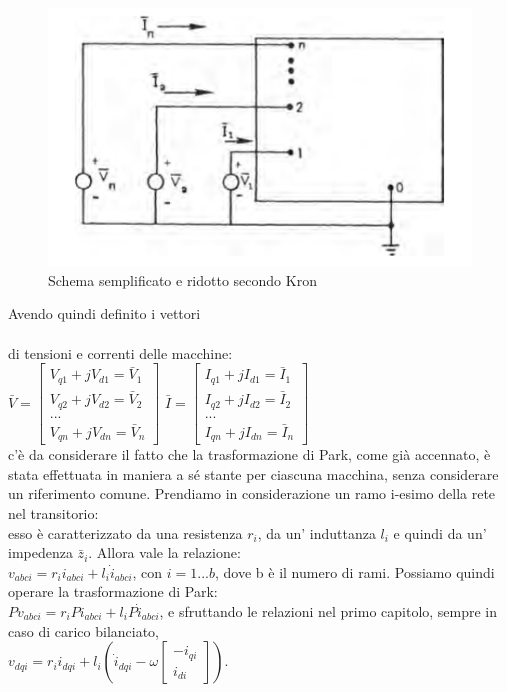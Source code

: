 \documentclass[Lau,noexaminfo]{sapthesis}
\begin{document}
	\begin{figure}
		\centering
		\includegraphics[height=0.25\textheight]{ridotta}
		\caption{Schema semplificato e ridotto secondo Kron}
	\end{figure}
	Avendo quindi definito i vettori\\\\ di tensioni e correnti delle macchine:\\
	$\bar{V}=\begin{bmatrix}
	V_{q1}+jV_{d1}=\bar{V}_1\\
	V_{q2}+jV_{d2}=\bar{V}_2\\
	...\\
	V_{qn}+jV_{dn}=\bar{V}_n
	\end{bmatrix}$\qquad
	$\bar{I}=\begin{bmatrix}
	I_{q1}+jI_{d1}=\bar{I}_1\\
	I_{q2}+jI_{d2}=\bar{I}_2\\
	...\\
	I_{qn}+jI_{dn}=\bar{I}_n
	\end{bmatrix}$\\
	c'è da considerare il fatto che la trasformazione di Park, come già accennato, è stata effettuata in maniera a sé stante per ciascuna macchina, senza considerare un riferimento comune.
	Prendiamo in considerazione un ramo i-esimo della rete nel transitorio:\\
	esso è caratterizzato da una resistenza $r_i$, da un' induttanza $l_i$ e quindi da un' impedenza $\bar{z}_i$. Allora vale la relazione:\\
	$v_{abci}=r_ii_{abci}+l_i\dot{i}_{abci}$, con $i=1...b$, dove b è il numero di rami.
	Possiamo quindi operare la trasformazione di Park:\\
	$Pv_{abci}=r_iPi_{abci}+l_iP\dot{i}_{abci}$, e sfruttando le relazioni nel primo capitolo, sempre in caso di carico bilanciato,\\ $v_{dqi}=r_ii_{dqi}+l_i(\dot{i}_{dqi}-\omega\begin{bmatrix}
	-i_{qi}\\
	i_{di}
	\end{bmatrix})$.\\
\end{document}
